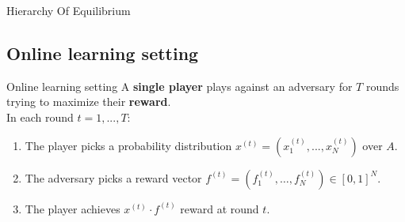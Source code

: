\documentclass[aspectratio=169,xcolor=dvipsnames,t]{beamer}
\begin{document}
\begin{frame}{Hierarchy Of Equilibrium}
\centering
{}
\begin{center}
\end{center}
\end{frame}

\subsection{Online learning setting}

\begin{frame}{Online learning setting}
    A \textbf{single player} plays against an adversary for $T$ rounds trying to maximize their \textbf{reward}.\\
    In each round $t = 1,...,T$:\\
    \begin{enumerate}[$\bullet$]
        \pause\item The player picks a probability distribution $x^{(t)}=(x_1^{(t)},...,x_N^{(t)})$ over $A$.
        \pause\item The adversary picks a reward vector $f^{(t)} = (f_1^{(t)},\dots,f_N^{(t)})\in [0,1]^N$.
        \pause\item 
            The player achieves $x^{(t)}\cdot f^{(t)}$ reward at round $t$.
    \end{enumerate}
\end{frame}

\end{document}
